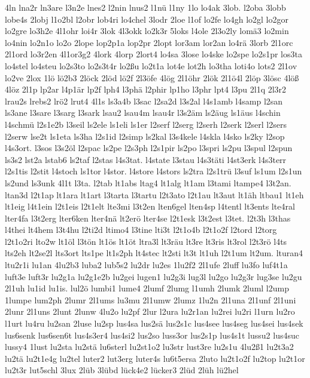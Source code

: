 {4ln
lna2r
ln3are
l3n2e
lnes2
l2nin
lnus2
l1nü
l1ny
1lo
lo4ak
3lob.
l2oba
3lobb
lobe4s
2lobj
l1o2bl
l2obr
lob4ri
lo4chel
3lodr
2loe
l1of
lo2fe
lo4gh
lo2gl
lo2gor
lo2gre
lo3h2e
4l1ohr
loi4r
3lok
4l3okk
lo2k3r
5loks
l4ole
2l3o2ly
lomä3
lo2min
lo4nin
lo2n1o
lo2o
2lope
lop2p1a
lop2pr
2lopt
lor3am
lor2an
lo4rä
3lorb
2l1orc
2l1ord
lo3r2en
4l1or3g2
4lork
4lorp
2lort4
lo4sa
3lose
lo4ske
lo2spe
lo2s1pr
los3ta
lo4stel
lo4steu
lo2s3to
lo2s3t4r
lo2ßu
lo2t1a
lot4e
lot2h
lo3tha
loti4o
lots2
2l1ov
lo2ve
2lox
1lö
lö2b3
2löck
2löd
lö2f
2l3öfe
4lög
2l1öhr
2lök
2l1ö4l
2löp
3lösc
4löß
4löz
2l1p
lp2ar
l4p1är
lp2f
lph4
l3phä
l2phir
lp1ho
l3phr
lpt4
l3pu
2l1q
2l3r2
lrau2s
lrebs2
lrö2
lrut4
4l1s
ls3a4b
l3sac
l2sa2d
l3s2al
l4s1amb
l4samp
l2san
ls3ane
l3sare
l3sarg
l3sark
lsau2
lsau4m
lsau4r
l3s2äm
ls2äug
ls1äus
l4schin
l4schmü
l2s1e2b
l3seil
ls2ele
ls1eli
ls1er
l2serf
l2serg
l2serh
l2serk
l2serl
l2sers
l2serw
lse2t
ls1eta
ls3ha
l2s1id
l2simp
ls2kal
l3s4kele
l4skla
l4sko
ls2ky
l2sop
l4s3ort.
l3sos
l3s2öl
l2spac
ls2pe
l2s3ph
l2s1pir
ls2po
l3spri
ls2pu
l3spul
l2spun
ls3s2
lst2a
lstab6
ls2taf
l2stas
l4s3tat.
l4state
l3stau
l4s3täti
l4st3erk
l4s3terr
l2s1tis
l2stit
l4stoch
ls1tor
l4stor.
l4store
l4stors
ls2tra
l2s1trü
l3suf
ls1um
l2s1un
ls2und
ls3unk
4l1t
l3ta.
l2tab
lt1abs
ltag4
lt1alg
lt1am
l3tami
ltampe4
l3t2an.
ltan3d
l2t1ap
lt1ara
lt1art
l3tarta
l3tartu
l2t3ato
l2t1au
lt3aut
lt1äh
ltbau1
lt1eh
lt1eig
l4t1ein
l2t1eis
l2t1elt
lte3mi
l3t2en
lten6gel
lten4sp
l4tentl
lt3ents
lte4ral
lter4fa
l3t2erg
lter6ken
lter4nä
lt2erö
lter4se
l2t1esk
l3t2est
l3tet.
l2t3h
l3thas
l4thei
lt4hem
l3t4hu
l2ti2d
ltimo4
l3tine
lti3t
l2t1o4b
l2t1o2f
l2tord
l2torg
l2t1o2ri
lto2w
lt1öl
l3tön
lt1ös
lt1öt
ltra3l
lt3räu
lt3re
lt3ris
lt3rol
l2t3rö
l4ts
lts2eh
lt2se2l
lts3ort
lts1pe
lt1s2ph
lt4stec
lt2sti
lt3t
lt1uh
l2t1um
lt2um.
lturan4
ltu2r1i
lu1an
4lu2b3
luba2
lub5s2
lu2dr
lu2es
1lu2f2
2l1ufe
2luff
lu3fo
luf4t1a
luft3e
luft3r
lu2g1a
lu2g1e2b
lu2gei
lugen1
lu2g3i
lug3l
lu2go
lu2g3r
lug3se
lu2gu
2l1uh
lu1id
lu1is.
lul2ö
lumbi1
lume4
2lumf
2lumg
l1umh
2lumk
2luml
l2ump
1lumpe
lum2ph
2lumr
2l1ums
lu3mu
2l1umw
2lumz
1lu2n
2l1una
2l1unf
2l1uni
2lunr
2l1uns
2lunt
2lunw
4lu2o
lu2pf
2lur
l2ura
lu2r1an
lu2rei
lu2ri
l1urn
lu2ro
l1urt
lu4ru
lu2san
2luse
lu2sp
lus4sa
lus2sä
lus2s1c
lus4see
lus4seg
lus4sei
lus4sek
lus6senk
lus6sen6t
lus4s3er4
lus4si2
lus2so
luss3or
lus2s1p
lus4s1t
lussu2
lus4suc
lussy4
1lust
lu2sta
lu2stä
lu6sterl
lu2st1o2
lu3str
lust3re
lu2s1u
4lu2ß1
lu2t3a2
lu2tä
lu2t1e4g
lu2tel
luter2
lut3erg
luter4s
lu6t5ersa
2luto
lu2t1o2f
lu2top
lu2t1or
lu2t3r
lut5schl
3lux
2lüb
3lübd
lück4e2
lücker3
2lüd
2lüh
lü2hel
}
